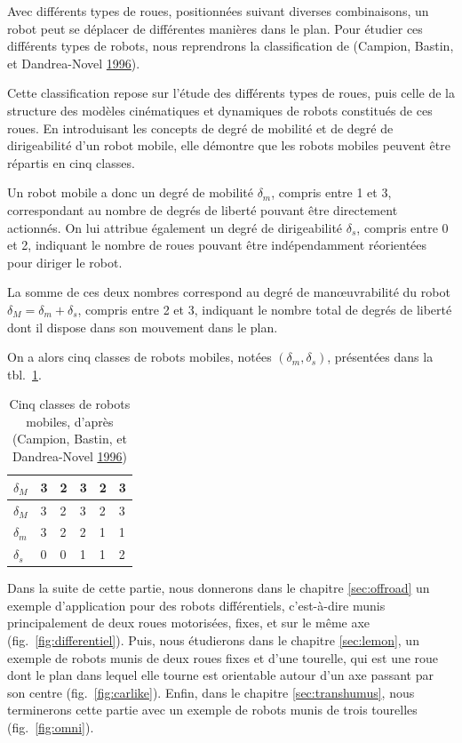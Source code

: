 \documentclass[french,A4paper,]{book}
\begin{document}
Avec différents types de roues, positionnées suivant diverses
combinaisons, un robot peut se déplacer de différentes manières dans le
plan. Pour étudier ces différents types de robots, nous reprendrons la
classification de (Campion, Bastin, et Dandrea-Novel
\protect\hyperlink{ref-campion96}{1996}).

Cette classification repose sur l'étude des différents types de roues,
puis celle de la structure des modèles cinématiques et dynamiques de
robots constitués de ces roues. En introduisant les concepts de degré de
mobilité et de degré de dirigeabilité d'un robot mobile, elle démontre
que les robots mobiles peuvent être répartis en cinq classes.

Un robot mobile a donc un degré de mobilité \(\delta_m\), compris entre
1 et 3, correspondant au nombre de degrés de liberté pouvant être
directement actionnés. On lui attribue également un degré de
dirigeabilité \(\delta_s\), compris entre 0 et 2, indiquant le nombre de
roues pouvant être indépendamment réorientées pour diriger le robot.

La somme de ces deux nombres correspond au degré de manœuvrabilité du
robot \(\delta_M = \delta_m + \delta_s\), compris entre 2 et 3,
indiquant le nombre total de degrés de liberté dont il dispose dans son
mouvement dans le plan.

On a alors cinq classes de robots mobiles, notées
\((\delta_m, \delta_s)\), présentées dans la tbl.~\ref{tbl:campion}.

\hypertarget{tbl:campion}{}
\begin{longtable}[]{@{}llllll@{}}
\caption{\label{tbl:campion}Cinq classes de robots mobiles, d'après
(Campion, Bastin, et Dandrea-Novel
\protect\hyperlink{ref-campion96}{1996}) }\tabularnewline
\toprule
\(\delta_M\) & 3 & 2 & 3 & 2 & 3\tabularnewline
\midrule
\endfirsthead
\toprule
\(\delta_M\) & 3 & 2 & 3 & 2 & 3\tabularnewline
\midrule
\endhead
\(\delta_m\) & 3 & 2 & 2 & 1 & 1\tabularnewline
\(\delta_s\) & 0 & 0 & 1 & 1 & 2\tabularnewline
\bottomrule
\end{longtable}

Dans la suite de cette partie, nous donnerons dans le chapitre
\ref{sec:offroad} un exemple d'application pour des robots
différentiels, c'est-à-dire munis principalement de deux roues
motorisées, fixes, et sur le même axe (fig.~\ref{fig:differentiel}).
Puis, nous étudierons dans le chapitre \ref{sec:lemon}, un exemple de
robots munis de deux roues fixes et d'une tourelle, qui est une roue
dont le plan dans lequel elle tourne est orientable autour d'un axe
passant par son centre (fig.~\ref{fig:carlike}). Enfin, dans le chapitre
\ref{sec:transhumus}, nous terminerons cette partie avec un exemple de
robots munis de trois tourelles (fig.~\ref{fig:omni}).
\end{document}
